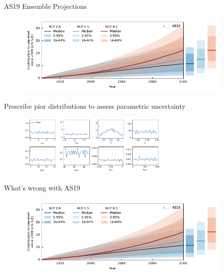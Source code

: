 \documentclass[hide notes,intlimits]{beamer}
\begin{document}
\begin{frame}{AS19 Ensemble Projections}
  \begin{minipage}[t][4cm][t]{\textwidth}
    \begin{figure}
      \includegraphics[height=4cm]{projection_as19_bars}
    \end{figure}
  \end{minipage}
  \alert{Prescribe pior distributions to assess parametric uncertainty}
  \begin{minipage}[t][3cm][t]{\textwidth}
    \begin{figure}
      \includegraphics[height=3cm]{prior}
    \end{figure}
  \end{minipage}
\end{frame}



\begin{frame}{What's wrong with AS19}
  \begin{minipage}[t][4cm][t]{\textwidth}
    \begin{figure}
      \includegraphics[height=4cm]{projection_as19_bars}
    \end{figure}
  \end{minipage}
  \begin{minipage}[t][3cm][t]{\textwidth}
  \end{minipage}
\end{frame}
\end{document}
